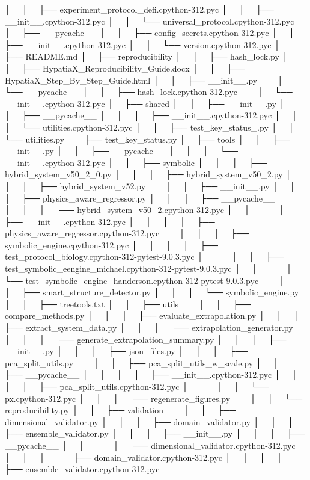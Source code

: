 │   │       ├── experiment_protocol_defi.cpython-312.pyc
│   │       ├── __init__.cpython-312.pyc
│   │       └── universal_protocol.cpython-312.pyc
│   ├── __pycache__
│   │   ├── config_secrets.cpython-312.pyc
│   │   ├── __init__.cpython-312.pyc
│   │   └── version.cpython-312.pyc
│   ├── README.md
│   ├── reproducibility
│   │   ├── hash_lock.py
│   │   ├── HypatiaX_Reproducibility_Guide.docx
│   │   ├── HypatiaX_Step_By_Step_Guide.html
│   │   ├── __init__.py
│   │   └── __pycache__
│   │       ├── hash_lock.cpython-312.pyc
│   │       └── __init__.cpython-312.pyc
│   ├── shared
│   │   ├── __init__.py
│   │   ├── __pycache__
│   │   │   ├── __init__.cpython-312.pyc
│   │   │   └── utilities.cpython-312.pyc
│   │   ├── test_key_status_.py
│   │   └── utilities.py
│   ├── test_key_status.py
│   ├── tools
│   │   ├── __init__.py
│   │   ├── __pycache__
│   │   │   └── __init__.cpython-312.pyc
│   │   ├── symbolic
│   │   │   ├── hybrid_system_v50_2_0.py
│   │   │   ├── hybrid_system_v50_2.py
│   │   │   ├── hybrid_system_v52.py
│   │   │   ├── __init__.py
│   │   │   ├── physics_aware_regressor.py
│   │   │   ├── __pycache__
│   │   │   │   ├── hybrid_system_v50_2.cpython-312.pyc
│   │   │   │   ├── __init__.cpython-312.pyc
│   │   │   │   ├── physics_aware_regressor.cpython-312.pyc
│   │   │   │   ├── symbolic_engine.cpython-312.pyc
│   │   │   │   ├── test_protocol_biology.cpython-312-pytest-9.0.3.pyc
│   │   │   │   ├── test_symbolic_eengine_michael.cpython-312-pytest-9.0.3.pyc
│   │   │   │   └── test_symbolic_engine_handerson.cpython-312-pytest-9.0.3.pyc
│   │   │   ├── smart_structure_detector.py
│   │   │   └── symbolic_engine.py
│   │   ├── treetools.txt
│   │   ├── utils
│   │   │   ├── compare_methods.py
│   │   │   ├── evaluate_extrapolation.py
│   │   │   ├── extract_system_data.py
│   │   │   ├── extrapolation_generator.py
│   │   │   ├── generate_extrapolation_summary.py
│   │   │   ├── __init__.py
│   │   │   ├── json_files.py
│   │   │   ├── pca_split_utils.py
│   │   │   ├── pca_split_utils_w_scale.py
│   │   │   ├── __pycache__
│   │   │   │   ├── __init__.cpython-312.pyc
│   │   │   │   ├── pca_split_utils.cpython-312.pyc
│   │   │   │   └── px.cpython-312.pyc
│   │   │   ├── regenerate_figures.py
│   │   │   └── reproducibility.py
│   │   ├── validation
│   │   │   ├── dimensional_validator.py
│   │   │   ├── domain_validator.py
│   │   │   ├── ensemble_validator.py
│   │   │   ├── __init__.py
│   │   │   ├── __pycache__
│   │   │   │   ├── dimensional_validator.cpython-312.pyc
│   │   │   │   ├── domain_validator.cpython-312.pyc
│   │   │   │   ├── ensemble_validator.cpython-312.pyc

